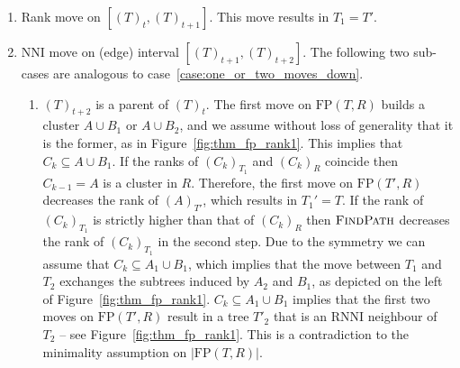 \documentclass[11pt]{amsart}
\newcommand{\rnni}{\mathrm{RNNI}}
\newcommand{\findpath}{\textsc{FindPath}}
\newcommand{\nni}{\mathrm{NNI}}
\newcommand{\fp}{\mathrm{FP}}
\begin{document}
\begin{enumerate}[label = 2.\arabic*]
\item Rank move on $[(T)_t,(T)_{t+1}]$.
This move results in $T_1 = T'$.

\item $\nni$ move on (edge) interval $[(T)_{t+1},(T)_{t+2}]$.
The following two sub-cases are analogous to case~\ref{case:one_or_two_moves_down}.

\begin{enumerate}[label = \theenumi.\arabic*]
	\item $(T)_{t+2}$ is a parent of $(T)_t$.
	The first move on $\fp(T, R)$ builds a cluster $A \cup B_1$ or $A \cup B_2$, and we assume without loss of generality that it is the former, as in Figure~\ref{fig:thm_fp_rank1}.
	This implies that $C_k \subseteq A \cup B_1$.
	If the ranks of $(C_k)_{T_1}$ and $(C_k)_R$ coincide then $C_{k-1} = A$ is a cluster in $R$.
	Therefore, the first move on $\fp(T', R)$ decreases the rank of $(A)_{T'}$, which results in $T_1' = T$.
	If the rank of $(C_k)_{T_1}$ is strictly higher than that of $(C_k)_R$ then $\findpath$ decreases the rank of $(C_k)_{T_1}$ in the second step.
	Due to the symmetry we can assume that $C_k \subseteq A_1 \cup B_1$, which implies that the move between $T_1$ and $T_2$ exchanges the subtrees induced by $A_2$ and $B_1$, as depicted on the left of Figure~\ref{fig:thm_fp_rank1}.
	$C_k \subseteq A_1 \cup B_1$ implies that the first two moves on $\fp(T', R)$ result in a tree $T'_2$ that is an $\rnni$ neighbour of $T_2$ -- see Figure~\ref{fig:thm_fp_rank1}.
	This is a contradiction to the minimality assumption on $|\fp(T,R)|$.


\end{enumerate}
\end{enumerate}
\end{document}
